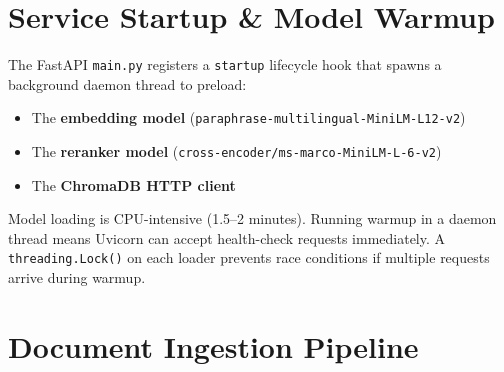 \documentclass[12pt,a4paper]{report}
\begin{document}
\section{Service Startup \& Model Warmup}

The FastAPI \texttt{main.py} registers a \texttt{startup} lifecycle hook that spawns a background daemon thread to preload:

\begin{itemize}
  \item The \textbf{embedding model} (\texttt{paraphrase-multilingual-MiniLM-L12-v2})
  \item The \textbf{reranker model} (\texttt{cross-encoder/ms-marco-MiniLM-L-6-v2})
  \item The \textbf{ChromaDB HTTP client}
\end{itemize}

Model loading is CPU-intensive (1.5--2 minutes). Running warmup in a daemon thread means Uvicorn can accept health-check requests immediately. A \texttt{threading.Lock()} on each loader prevents race conditions if multiple requests arrive during warmup.

\section{Document Ingestion Pipeline}
\end{document}
